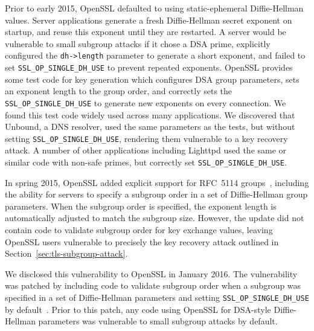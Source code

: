Prior to early 2015, OpenSSL defaulted to using static-ephemeral Diffie-Hellman
values. Server applications generate a fresh Diffie-Hellman secret exponent on
startup, and reuse this exponent until they are restarted.  A server would be
vulnerable to small subgroup attacks if it chose a DSA prime, explicitly
configured the \texttt{dh->length} parameter to generate a short exponent, and
failed to set \texttt{SSL\_OP\_SINGLE\_DH\_USE} to prevent repeated exponents.
OpenSSL provides some test code for key generation which configures DSA group
parameters, sets an exponent length to the group order, and correctly sets the
\texttt{SSL\_OP\_SINGLE\_DH\_USE} to generate new exponents on every
connection.  We found this test code widely used across many applications.  We
discovered that Unbound, a DNS resolver, used the same parameters as the tests,
but without setting \texttt{SSL\_OP\_SINGLE\_DH\_USE}, rendering them
vulnerable to a key recovery attack.  A number of other applications including
Lighttpd used the same or similar code with non-safe primes, but correctly set
\texttt{SSL\_OP\_SINGLE\_DH\_USE}.

In spring 2015, OpenSSL added explicit support for RFC~5114
groups~\cite{openssl-changelog-102}, including the ability for servers to
specify a subgroup order in a set of Diffie-Hellman group parameters. When the
subgroup order is specified, the exponent length is automatically adjusted to
match the subgroup size.  However, the update did not contain code to validate
subgroup order for key exchange values, leaving OpenSSL users vulnerable to
precisely the key recovery attack outlined in
Section~\ref{sec:tls-subgroup-attack}.

We disclosed this vulnerability to OpenSSL in January 2016. The vulnerability
was patched by including code to validate subgroup order when a subgroup was
specified in a set of Diffie-Hellman parameters and setting
\texttt{SSL\_OP\_SINGLE\_DH\_USE} by default~\cite{openssl-secadv-subgroup}.
Prior to this patch, any code using OpenSSL for DSA-style Diffie-Hellman
parameters was vulnerable to small subgroup attacks by default.

